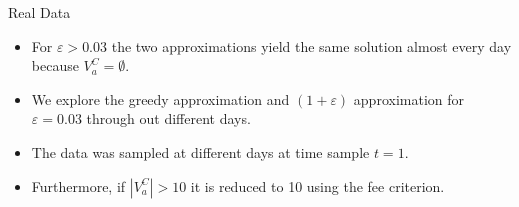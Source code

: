 \documentclass{beamer}
\begin{document}
\begin{comment}
\begin{frame}{Real Data}{Experiment I}
    \begin{block}{Experiment I}
    First we explore how the approximations behave, especially how the 
    $(1+\varepsilon)$ approximation behaves for different $\varepsilon$. 
    In this experiment we tried $$\varepsilon \in 
    \{0.01,0.03,0.1,0.2,0.3,0.4,0.5,0.6,0.7,0.8,0.9,1\}$$   
    The data was collected on 28/08/2017 and the time sample is $t=1$.
    \end{block}
\end{frame}

\begin{frame}{Real Data}{Experiment I}
    \begin{figure}
        \centering
        \texttt{[image: Figure15v2.png]}
        \caption{Profit relative to the greedy approximation as a function 
        of $\varepsilon$}
    \end{figure}
\end{frame}

\begin{frame}{Real Data}{Experiment I}
    \begin{figure}
        \centering
        \texttt{[image: Figure16v2.png]}
        \caption{Runtime in seconds as a function of $\varepsilon$}
    \end{figure}
\end{frame}
\end{comment}
\begin{frame}{Real Data}
    \begin{itemize}
        \item {For $\varepsilon > 0.03$ the two approximations yield the same solution almost every day because $V_a^C = \emptyset$.}
        \item {We explore the greedy approximation and $(1+\varepsilon)$ 
        approximation for $\varepsilon = 0.03$ through out 
        different days.}
        \item {The data was sampled at different days at time sample $t=1$.}
        \item {Furthermore, if $|V_a^C| > 10$ it is reduced to 10 using the
        fee criterion.}
    \end{itemize}
\end{frame}
\end{document}

